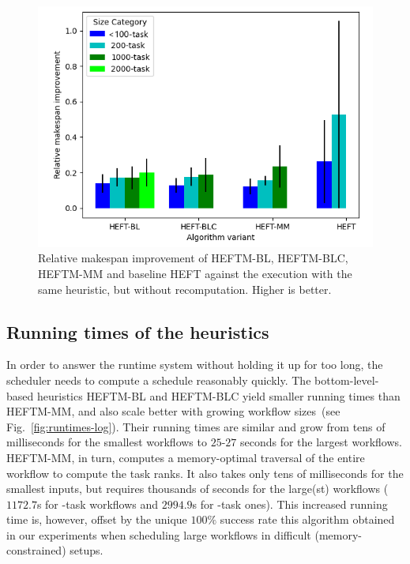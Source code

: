 \documentclass[conference]{IEEEtran}
\newcommand{\algo}[1]{\textsc{#1}}
\newcommand{\heft}{\algo{HEFT}\xspace}
\newcommand{\heftmm}{\algo{HEFTM-MM}\xspace}
\newcommand{\heftbl}{\algo{HEFTM-BL}\xspace}
\newcommand{\heftblc}{\algo{HEFTM-BLC}\xspace}
\newcommand{\new}[1]{{\color{blue}#1}}
\begin{document}
\begin{figure}[tb]
    \centering
    \includegraphics[width=0.95\columnwidth] {images/UpdatesMss2}
    \caption{
    \new{Relative makespan improvement of \heftbl, \heftblc, \heftmm and baseline \heft against
    the execution with the same heuristic, but without recomputation. Higher is better. } }
    \label{fig:updates-ms}
\end{figure}


\subsection{Running times of the heuristics}
\label{sec.expe.t}
%
In order to answer the runtime system without holding it up for too long, the scheduler needs to 
compute a schedule reasonably quickly. %
The bottom-level-based heuristics \heftbl and \heftblc yield smaller running times than \heftmm, 
and also scale better with growing workflow sizes~(see Fig.~\ref{fig:runtimes-log}).
Their running times are similar and grow from tens of milliseconds for the smallest workflows to 
$25$-$27$ seconds for the largest workflows.
\heftmm, in turn, computes a memory-optimal traversal of the entire workflow to compute the task ranks. 
It also takes only tens of milliseconds for the smallest inputs, but requires
thousands of seconds for the large(st) workflows ($1172.7$s for -task workflows and
$2994.9$s for -task ones).
This increased running time is, however, offset by the unique $100\%$ success rate this algorithm 
obtained in our experiments when scheduling large workflows in difficult (memory-constrained) setups.
\end{document}
